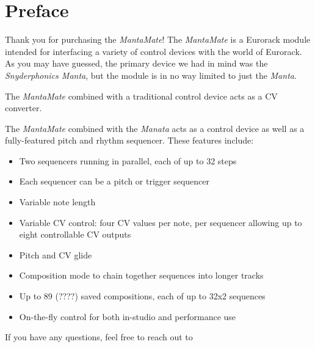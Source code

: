 

\chapter{Preface}

Thank you for purchasing the \emph{MantaMate}!
The \emph{MantaMate} is a Eurorack module intended for interfacing a variety of
control devices with the world of Eurorack. As you may have guessed, the primary
device we had in mind was the \emph{Snyderphonics Manta}, but the module is in
no way limited to just the \emph{Manta}.

The \emph{MantaMate} combined with a traditional control device acts as a CV
converter.

The \emph{MantaMate} combined with the \emph{Manata} acts as a control device
as well as a fully-featured pitch and rhythm sequencer. These features include:

\begin{itemize}
  \item Two sequencers running in parallel, each of up to 32 steps
  \item Each sequencer can be a pitch or trigger sequencer
  \item Variable note length
  \item Variable CV control: four CV values per note, per sequencer allowing
  up to eight controllable CV outputs
  \item Pitch and CV glide
  \item Composition mode to chain together sequences into longer tracks
  \item Up to 89 (????) saved compositions, each of up to 32x2 sequences
  \item On-the-fly control for both in-studio and performance use
\end{itemize}

\noindent If you have any questions, feel free to reach out to  \\


\endinput


%

